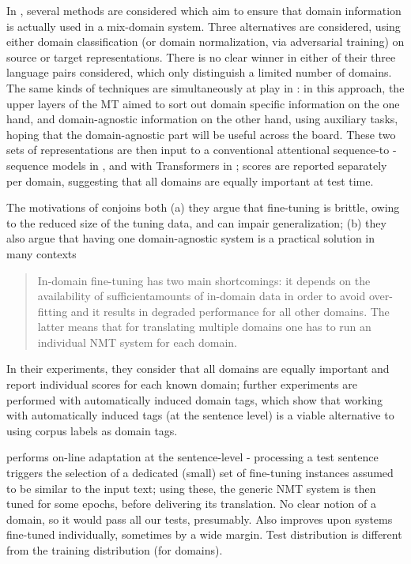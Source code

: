 \documentclass[11pt]{article}
\begin{document}
In \cite{Britz17mixing}, several methods are considered which aim to ensure that domain information is actually used in a mix-domain system. Three alternatives are considered, using either domain classification (or domain normalization, via adversarial training) on source or target representations. There is no clear winner in either of their three language pairs considered, which only distinguish a limited number of domains. The same kinds of techniques are simultaneously at play in \cite{Zeng18multidomain,Su19exploring}: in this approach, the upper layers of the MT aimed to sort out domain specific information on the one hand, and domain-agnostic information on the other hand, using auxiliary tasks, hoping that the domain-agnostic part will be useful across the board. These two sets of representations are then input to a conventional attentional sequence-to -sequence models in \cite{Zeng18multidomain}, and with Transformers in \cite{Su19exploring}; scores are reported separately per domain, suggesting that all domains are equally important at test time.

The motivations of \cite{Tars18multidomain} conjoins both (a) they argue that fine-tuning is brittle, owing to the reduced size of the tuning data, and can impair generalization; (b) they also argue that having one domain-agnostic system is a practical solution in many contexts
\begin{quote}
  In-domain fine-tuning has two main shortcomings: it depends on the availability of sufficientamounts of in-domain data in order to avoid over-fitting and it results in degraded performance for all other domains. The latter means that for translating multiple domains one has to run an individual NMT system for each domain.
\end{quote}
In their experiments, they consider that all domains are equally important and report individual scores for each known domain; further experiments are performed with automatically induced domain tags, which show that working with automatically induced tags (at the sentence level) is a viable alternative to using corpus labels as domain tags.

\cite{Farajian17multidomain} performs on-line adaptation at the sentence-level - processing a test sentence triggers the selection of a dedicated (small) set of fine-tuning instances assumed to be similar to the input text; using these, the generic NMT system is then tuned for some epochs, before delivering its translation. No clear notion of a domain, so it would pass all our tests, presumably.  Also improves upon systems fine-tuned individually, sometimes by a wide margin. Test distribution is different from the training distribution (for domains). 
\end{document}
